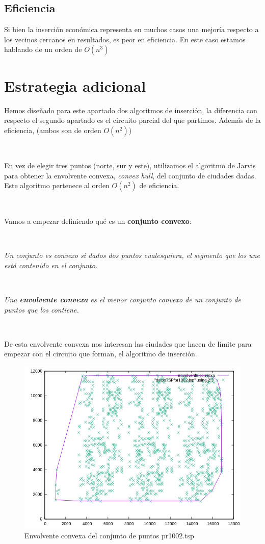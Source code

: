 \documentclass{article}
\begin{document}
	\subsection{Eficiencia}
	Si bien la inserción económica representa en muchos casos una mejoría respecto a los vecinos cercanos en resultados, es peor en eficiencia. En este caso estamos hablando de un orden de $O(n^3)$
\section{Estrategia adicional}
	Hemos diseñado para este apartado dos algoritmos de inserción, la diferencia con respecto el segundo apartado es el circuito parcial del que partimos. Además de la eficiencia, (ambos son de orden $O(n^2)$)
	
	
	\
	
	En vez de elegir tres puntos (norte, sur y este), utilizamos el algoritmo de Jarvis para obtener la envolvente convexa, \textit{convex hull}, del conjunto de ciudades dadas. Este algoritmo pertenece al orden $O(n^2)$ de eficiencia.
	
	\
	
	Vamos a empezar definiendo qué es un \textbf{conjunto convexo}:
	
	\
	
	\textit{Un conjunto es convexo si dados dos puntos cualesquiera, el segmento que los une está contenido en el conjunto.} 
	
	\
	
\textit{	Una \textbf{envolvente convexa} es el menor conjunto convexo de un conjunto de puntos que los contiene.}
	
	\
	
	De esta envolvente convexa nos interesan las ciudades que hacen de límite para empezar con el circuito que forman, el algoritmo de inserción.
	
	\begin{figure}[H]
		\centering
		\includegraphics[totalheight=8cm]{img/envolvente_convexa}
		\caption{Envolvente convexa del conjunto de puntos pr1002.tsp}
		\label{fig:envolvente_convexa}
	\end{figure}
\end{document}
